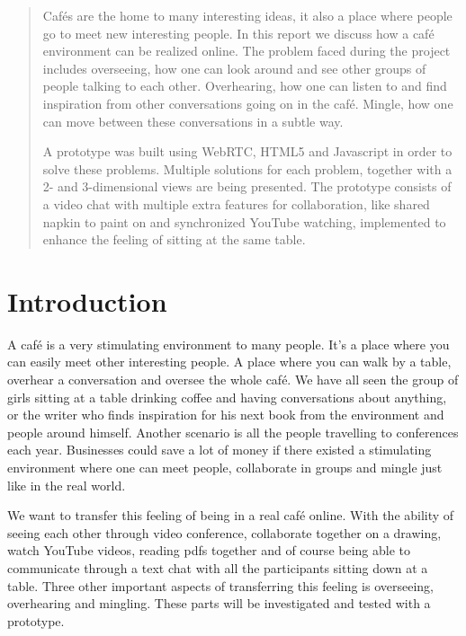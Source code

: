 \documentclass[12pt, titlepage]{article}
\begin{document}
\maketitle
\newpage
\begin{abstract}
Cafés are the home to many interesting ideas, it also a place where people go to meet new interesting people. In this report we discuss how a café environment can be realized online. The problem faced during the project includes overseeing, how one can look around and see other groups of people talking to each other. Overhearing, how one can listen to and find inspiration from other conversations going on in the café. Mingle, how one can move between these conversations in a subtle way.

A prototype was built using WebRTC, HTML5 and Javascript in order to solve these problems. Multiple solutions for each problem, together with a 2- and 3-dimensional views are being presented. The prototype consists of a video chat with multiple extra features for collaboration, like shared napkin to paint on and  synchronized YouTube watching, implemented to enhance the feeling of sitting at the same table. 
\end{abstract}
\tableofcontents
\clearpage
\section{Introduction}
A café is a very stimulating environment to many people. It’s a place where you can easily meet other interesting people. A place where you can walk by a table, overhear a conversation and oversee the whole café. We have all seen the group of girls sitting at a table drinking coffee and having conversations about anything, or the writer who finds inspiration for his next book from the environment and people around himself. Another scenario is all the people travelling to conferences each year. Businesses could save a lot of money if there existed a stimulating environment where one can meet people, collaborate in groups and mingle just like in the real world.

We want to transfer this feeling of being in a real café online. With the ability of seeing each other through video conference, collaborate together on a drawing, watch YouTube videos, reading pdfs together and of course being able to communicate through a text chat with all the participants sitting down at a table. Three other important aspects of transferring this feeling is overseeing, overhearing and mingling. These parts will be investigated and tested with a prototype.
\end{document}
